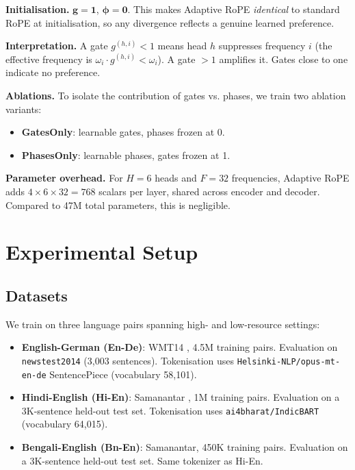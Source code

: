 \documentclass[conference]{IEEEtran}
\begin{document}
\textbf{Initialisation.} $\mathbf{g} = \mathbf{1}$, $\boldsymbol{\phi} =
\mathbf{0}$. This makes Adaptive RoPE \emph{identical} to standard RoPE at
initialisation, so any divergence reflects a genuine learned preference.

\textbf{Interpretation.} A gate $g^{(h,i)} < 1$ means head $h$ suppresses
frequency $i$ (the effective frequency is $\omega_i \cdot g^{(h,i)} < \omega_i$).
A gate $> 1$ amplifies it. Gates close to one indicate no preference.

\textbf{Ablations.} To isolate the contribution of gates vs. phases, we train
two ablation variants:
\begin{itemize}
  \item \textbf{GatesOnly}: learnable gates, phases frozen at 0.
  \item \textbf{PhasesOnly}: learnable phases, gates frozen at 1.
\end{itemize}

\textbf{Parameter overhead.} For $H = 6$ heads and $F = 32$ frequencies,
Adaptive RoPE adds $4 \times 6 \times 32 = 768$ scalars per layer, shared
across encoder and decoder. Compared to 47M total parameters, this is
negligible.

\section{Experimental Setup}
\label{sec:setup}

\subsection{Datasets}

We train on three language pairs spanning high- and low-resource settings:

\begin{itemize}
  \item \textbf{English-German (En-De)}: WMT14 \cite{bojar2014wmt}, 4.5M
        training pairs. Evaluation on \texttt{newstest2014} (3,003 sentences).
        Tokenisation uses \texttt{Helsinki-NLP/opus-mt-en-de} SentencePiece
        (vocabulary 58,101).
  \item \textbf{Hindi-English (Hi-En)}: Samanantar \cite{ramesh2022samanantar},
        1M training pairs. Evaluation on a 3K-sentence held-out test set.
        Tokenisation uses \texttt{ai4bharat/IndicBART} (vocabulary 64,015).
  \item \textbf{Bengali-English (Bn-En)}: Samanantar, 450K training pairs.
        Evaluation on a 3K-sentence held-out test set. Same tokenizer as Hi-En.
\end{itemize}
\end{document}
